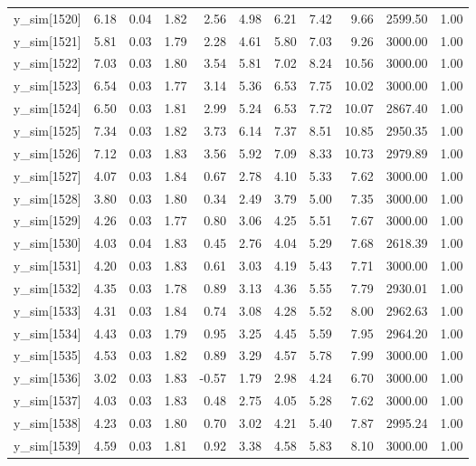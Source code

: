 \begin{table}[ht]
\begin{tabular}{rrrrrrrrrrr}
  y\_sim[1520] & 6.18 & 0.04 & 1.82 & 2.56 & 4.98 & 6.21 & 7.42 & 9.66 & 2599.50 & 1.00 \\ 
  y\_sim[1521] & 5.81 & 0.03 & 1.79 & 2.28 & 4.61 & 5.80 & 7.03 & 9.26 & 3000.00 & 1.00 \\ 
  y\_sim[1522] & 7.03 & 0.03 & 1.80 & 3.54 & 5.81 & 7.02 & 8.24 & 10.56 & 3000.00 & 1.00 \\ 
  y\_sim[1523] & 6.54 & 0.03 & 1.77 & 3.14 & 5.36 & 6.53 & 7.75 & 10.02 & 3000.00 & 1.00 \\ 
  y\_sim[1524] & 6.50 & 0.03 & 1.81 & 2.99 & 5.24 & 6.53 & 7.72 & 10.07 & 2867.40 & 1.00 \\ 
  y\_sim[1525] & 7.34 & 0.03 & 1.82 & 3.73 & 6.14 & 7.37 & 8.51 & 10.85 & 2950.35 & 1.00 \\ 
  y\_sim[1526] & 7.12 & 0.03 & 1.83 & 3.56 & 5.92 & 7.09 & 8.33 & 10.73 & 2979.89 & 1.00 \\ 
  y\_sim[1527] & 4.07 & 0.03 & 1.84 & 0.67 & 2.78 & 4.10 & 5.33 & 7.62 & 3000.00 & 1.00 \\ 
  y\_sim[1528] & 3.80 & 0.03 & 1.80 & 0.34 & 2.49 & 3.79 & 5.00 & 7.35 & 3000.00 & 1.00 \\ 
  y\_sim[1529] & 4.26 & 0.03 & 1.77 & 0.80 & 3.06 & 4.25 & 5.51 & 7.67 & 3000.00 & 1.00 \\ 
  y\_sim[1530] & 4.03 & 0.04 & 1.83 & 0.45 & 2.76 & 4.04 & 5.29 & 7.68 & 2618.39 & 1.00 \\ 
  y\_sim[1531] & 4.20 & 0.03 & 1.83 & 0.61 & 3.03 & 4.19 & 5.43 & 7.71 & 3000.00 & 1.00 \\ 
  y\_sim[1532] & 4.35 & 0.03 & 1.78 & 0.89 & 3.13 & 4.36 & 5.55 & 7.79 & 2930.01 & 1.00 \\ 
  y\_sim[1533] & 4.31 & 0.03 & 1.84 & 0.74 & 3.08 & 4.28 & 5.52 & 8.00 & 2962.63 & 1.00 \\ 
  y\_sim[1534] & 4.43 & 0.03 & 1.79 & 0.95 & 3.25 & 4.45 & 5.59 & 7.95 & 2964.20 & 1.00 \\ 
  y\_sim[1535] & 4.53 & 0.03 & 1.82 & 0.89 & 3.29 & 4.57 & 5.78 & 7.99 & 3000.00 & 1.00 \\ 
  y\_sim[1536] & 3.02 & 0.03 & 1.83 & -0.57 & 1.79 & 2.98 & 4.24 & 6.70 & 3000.00 & 1.00 \\ 
  y\_sim[1537] & 4.03 & 0.03 & 1.83 & 0.48 & 2.75 & 4.05 & 5.28 & 7.62 & 3000.00 & 1.00 \\ 
  y\_sim[1538] & 4.23 & 0.03 & 1.80 & 0.70 & 3.02 & 4.21 & 5.40 & 7.87 & 2995.24 & 1.00 \\ 
  y\_sim[1539] & 4.59 & 0.03 & 1.81 & 0.92 & 3.38 & 4.58 & 5.83 & 8.10 & 3000.00 & 1.00 \\ 

\end{tabular}
\end{table}
